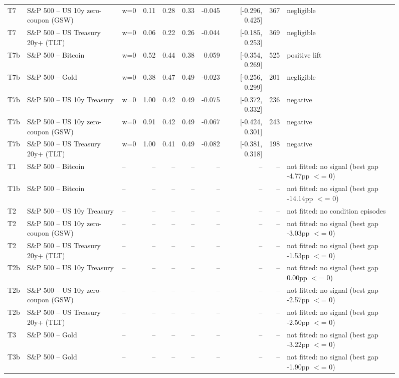 \begin{figure}
\begin{tabular}{lllrrrrrrl}
T7 & S\&P 500 -- US 10y zero-coupon (GSW) & w=0 & 0.11 & 0.28 & 0.33 & -0.045 & [-0.296, 0.425] & 367 & negligible \\
T7 & S\&P 500 -- US Treasury 20y+ (TLT) & w=0 & 0.06 & 0.22 & 0.26 & -0.044 & [-0.185, 0.253] & 369 & negligible \\
T7b & S\&P 500 -- Bitcoin & w=0 & 0.52 & 0.44 & 0.38 & 0.059 & [-0.354, 0.269] & 525 & positive lift \\
T7b & S\&P 500 -- Gold & w=0 & 0.38 & 0.47 & 0.49 & -0.023 & [-0.256, 0.299] & 201 & negligible \\
T7b & S\&P 500 -- US 10y Treasury & w=0 & 1.00 & 0.42 & 0.49 & -0.075 & [-0.372, 0.332] & 236 & negative \\
T7b & S\&P 500 -- US 10y zero-coupon (GSW) & w=0 & 0.91 & 0.42 & 0.49 & -0.067 & [-0.424, 0.301] & 243 & negative \\
T7b & S\&P 500 -- US Treasury 20y+ (TLT) & w=0 & 1.00 & 0.41 & 0.49 & -0.082 & [-0.381, 0.318] & 198 & negative \\
T1 & S\&P 500 -- Bitcoin & -- & -- & -- & -- & -- & -- & -- & not fitted: no signal (best gap -4.77pp $<$= 0) \\
T1b & S\&P 500 -- Bitcoin & -- & -- & -- & -- & -- & -- & -- & not fitted: no signal (best gap -14.14pp $<$= 0) \\
T2 & S\&P 500 -- US 10y Treasury & -- & -- & -- & -- & -- & -- & -- & not fitted: no condition episodes \\
T2 & S\&P 500 -- US 10y zero-coupon (GSW) & -- & -- & -- & -- & -- & -- & -- & not fitted: no signal (best gap -3.03pp $<$= 0) \\
T2 & S\&P 500 -- US Treasury 20y+ (TLT) & -- & -- & -- & -- & -- & -- & -- & not fitted: no signal (best gap -1.53pp $<$= 0) \\
T2b & S\&P 500 -- US 10y Treasury & -- & -- & -- & -- & -- & -- & -- & not fitted: no signal (best gap 0.00pp $<$= 0) \\
T2b & S\&P 500 -- US 10y zero-coupon (GSW) & -- & -- & -- & -- & -- & -- & -- & not fitted: no signal (best gap -2.57pp $<$= 0) \\
T2b & S\&P 500 -- US Treasury 20y+ (TLT) & -- & -- & -- & -- & -- & -- & -- & not fitted: no signal (best gap -2.50pp $<$= 0) \\
T3 & S\&P 500 -- Gold & -- & -- & -- & -- & -- & -- & -- & not fitted: no signal (best gap -3.22pp $<$= 0) \\
T3b & S\&P 500 -- Gold & -- & -- & -- & -- & -- & -- & -- & not fitted: no signal (best gap -1.90pp $<$= 0) \\

\end{tabular}
\end{figure}

